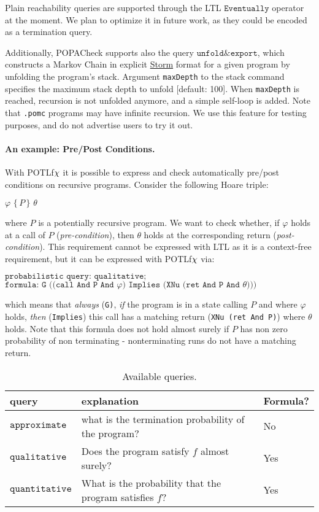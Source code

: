\documentclass[9pt,a4paper]{article}
\begin{document}
Plain reachability queries are supported through the LTL $\texttt{Eventually}$ operator at the moment. We plan to optimize it in future work, as they could be encoded as a termination query. 

Additionally, POPACheck supports also the query $\texttt{unfold\&export}$, which constructs a Markov Chain in explicit \href{https://www.stormchecker.org/documentation/background/languages.html}{Storm} format for a given program by unfolding the program's stack. Argument \verb|maxDepth| to the stack command specifies the maximum stack depth to unfold [default: 100]. When \verb|maxDepth| is reached, recursion is not unfolded anymore, and a simple self-loop is added. Note that \verb|.pomc| programs may have infinite recursion. We use this feature for testing purposes, and do not advertise users to try it out.

\paragraph{An example: Pre/Post Conditions.}
With POTLf$\chi$ it is possible to express and check automatically pre/post conditions on recursive programs. Consider the following Hoare triple:
\begin{center}
    $\varphi \, \, \{ \, P \, \} \,\, \theta$
\end{center}
where $P$ is a potentially recursive program. We want to check whether, if $\varphi$ holds at a call of $P$ (\emph{pre-condition}), then $\theta$ holds at the corresponding return (\emph{post-condition}). This requirement cannot be expressed with LTL as it is a context-free requirement, but it can be expressed with POTLf$\chi$ via: 
\begin{center}
    $\texttt{probabilistic query: qualitative;}$
    $\texttt{formula: G ((call And P And } \varphi \texttt{) Implies (XNu (ret And P And } \theta \texttt{)))}$
\end{center}
which means that \emph{always} (\texttt{G)}, \emph{if} the program is in a state calling $P$ and where $\varphi$ holds, \emph{then} (\texttt{Implies}) this call has a matching return (\texttt{XNu (ret And P)}) where $\theta$ holds. Note that this formula does not hold almost surely if $P$ has non zero probability of non terminating - nonterminating runs do not have a matching return.

\begin{table}
\centering
\begin{tabular}{| l | l | l |}
\hline
 query & explanation & Formula? \\
\hline
\hline
$\texttt{approximate}$ & what is the termination probability of the program? & No \\ 
$\texttt{qualitative}$ & Does the program satisfy $f$ almost surely? & Yes \\ 
$\texttt{quantitative}$ & What is the probability that the program satisfies $f$? & Yes \\ 
\hline
\end{tabular}
\caption{Available queries.}
\label{tab:queries}
\end{table}
\end{document}
